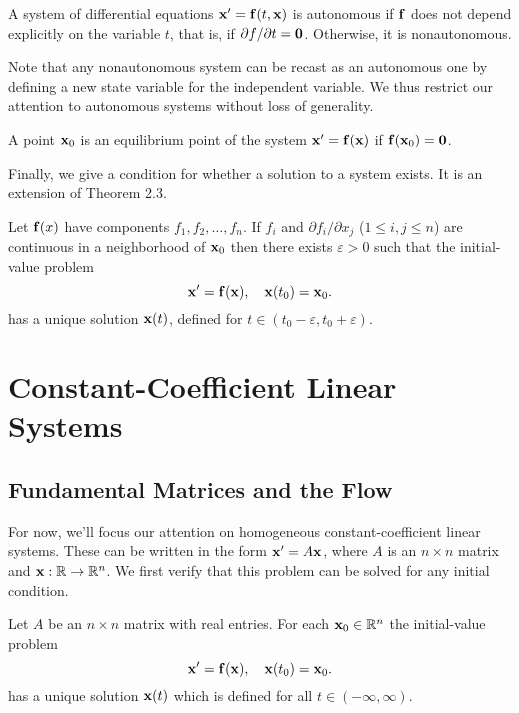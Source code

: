 \documentclass[../m082main.tex]{subfiles}
\begin{document}
\begin{definition}
    A system of differential equations $\mathbf{x}' = \mathbf{f}(t, \mathbf{x})$ is autonomous if $\mathbf{f}$ does not depend explicitly on the variable $t$, that is, if $\partial f / \partial t = \mathbf{0}$.
    Otherwise, it is nonautonomous.
\end{definition}

Note that any nonautonomous system can be recast as an autonomous one by defining a new state variable for the independent variable.
We thus restrict our attention to autonomous systems without loss of generality.

\begin{definition}
    A point $\mathbf{x}_0$ is an equilibrium point of the system $\mathbf{x}' = \mathbf{f}(\mathbf{x})$ if $\mathbf{f}(\mathbf{x}_0) = \mathbf{0}$.
\end{definition}

Finally, we give a condition for whether a solution to a system exists.
It is an extension of Theorem 2.3.

\begin{theorem}
    Let $\mathbf{f}(x)$ have components $f_1, f_2, \ldots, f_n$.
    If $f_i$ and $\partial f_i / \partial x_j$ ($1 \leq i,j \leq n$) are continuous in a neighborhood of $\mathbf{x}_0$ then there exists $\varepsilon > 0$ such that the initial-value problem
    \[ \mathbf{x}' = \mathbf{f}(\mathbf{x}), \quad \mathbf{x}(t_0) = \mathbf{x}_0. \]
    has a unique solution $\mathbf{x}(t)$, defined for $t \in (t_0 - \varepsilon, t_0 + \varepsilon)$.
\end{theorem}

\section{Constant-Coefficient Linear Systems}
\subsection{Fundamental Matrices and the Flow}
For now, we'll focus our attention on homogeneous constant-coefficient linear systems.
These can be written in the form $\mathbf{x}' = A \mathbf{x}$, where $A$ is an $n \times n$ matrix and $\mathbf{x} : \mathbb{R} \to \mathbb{R}^n$.
We first verify that this problem can be solved for any initial condition.

\begin{theorem}
    Let $A$ be an $n \times n$ matrix with real entries.
    For each $\mathbf{x}_0 \in \mathbb{R}^n$ the initial-value problem
    \[ \mathbf{x}' = \mathbf{f}(\mathbf{x}), \quad \mathbf{x}(t_0) = \mathbf{x}_0. \]
    has a unique solution $\mathbf{x}(t)$ which is defined for all $t \in (-\infty, \infty)$.
\end{theorem}
\end{document}
